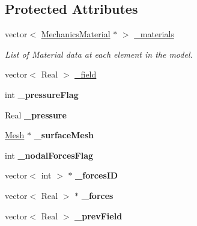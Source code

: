 \subsection*{Protected Attributes}
\begin{DoxyCompactItemize}
\item 
\hypertarget{classvoom_1_1_mechanics_model_abdba86a197a3e053f7fc3d98a4c35e8d}{
vector$<$ \hyperlink{classvoom_1_1_mechanics_material}{MechanicsMaterial} $\ast$ $>$ \hyperlink{classvoom_1_1_mechanics_model_abdba86a197a3e053f7fc3d98a4c35e8d}{\_\-materials}}
\label{classvoom_1_1_mechanics_model_abdba86a197a3e053f7fc3d98a4c35e8d}

\begin{DoxyCompactList}\small\item\em List of Material data at each element in the model. \item\end{DoxyCompactList}\item 
vector$<$ Real $>$ \hyperlink{classvoom_1_1_mechanics_model_a0c96adf9c1e07f5b604a3db9ffe9b750}{\_\-field}
\item 
\hypertarget{classvoom_1_1_mechanics_model_a29fe651bd66bebc10f448c2a1e0cb255}{
int {\bfseries \_\-pressureFlag}}
\label{classvoom_1_1_mechanics_model_a29fe651bd66bebc10f448c2a1e0cb255}

\item 
\hypertarget{classvoom_1_1_mechanics_model_a9af310f78ef6e9d5903eb9624a55b033}{
Real {\bfseries \_\-pressure}}
\label{classvoom_1_1_mechanics_model_a9af310f78ef6e9d5903eb9624a55b033}

\item 
\hypertarget{classvoom_1_1_mechanics_model_a99688bb2b736b933fcdecc9d5ebe4ba9}{
\hyperlink{classvoom_1_1_mesh}{Mesh} $\ast$ {\bfseries \_\-surfaceMesh}}
\label{classvoom_1_1_mechanics_model_a99688bb2b736b933fcdecc9d5ebe4ba9}

\item 
\hypertarget{classvoom_1_1_mechanics_model_abbd7f67d13e6ae3aedb25e8b87fb4ce3}{
int {\bfseries \_\-nodalForcesFlag}}
\label{classvoom_1_1_mechanics_model_abbd7f67d13e6ae3aedb25e8b87fb4ce3}

\item 
\hypertarget{classvoom_1_1_mechanics_model_a935f58ecabcad603cdce6df9445ecffd}{
vector$<$ int $>$ $\ast$ {\bfseries \_\-forcesID}}
\label{classvoom_1_1_mechanics_model_a935f58ecabcad603cdce6df9445ecffd}

\item 
\hypertarget{classvoom_1_1_mechanics_model_a4ed281e882e7e93ff9f6807e7c8eef11}{
vector$<$ Real $>$ $\ast$ {\bfseries \_\-forces}}
\label{classvoom_1_1_mechanics_model_a4ed281e882e7e93ff9f6807e7c8eef11}

\item 
\hypertarget{classvoom_1_1_mechanics_model_ad91ef4d69cdf51ea0a58ff9cde8e8fbb}{
vector$<$ Real $>$ {\bfseries \_\-prevField}}
\label{classvoom_1_1_mechanics_model_ad91ef4d69cdf51ea0a58ff9cde8e8fbb}

\end{DoxyCompactItemize}


